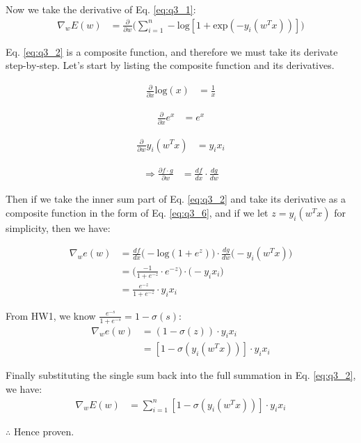Now we take the derivative of Eq. \ref{eq:q3_1}:
\begin{align}
    \nabla_w E(w) &= \frac{\partial}{\partial w} \Bigg(\sum_{i=1}^{n} -\text{log} [1+ \text{exp}(-y_i (w^T x))] \Bigg) \label{eq:q3_2}
\end{align}

Eq. \ref{eq:q3_2} is a composite function, and therefore we must take its derivate step-by-step. Let's start by listing the composite function and its derivatives.

\begin{align}
    \frac{\partial}{\partial x} \text{log}(x) &= \frac{1}{x} \label{eq:q3_3}
\end{align}

\begin{align}
    \frac{\partial}{\partial x} e^x &= e^x \label{eq:q3_4}
\end{align}

\begin{align}
    \frac{\partial}{\partial w} y_i (w^T x) &= y_i x_i \label{eq:q3_5}
\end{align}

\begin{align}
    \Rightarrow \frac{\partial f \cdot g}{\partial w} &= \frac{d f}{d x} \cdot \frac{d g}{d w} \label{eq:q3_6}
\end{align}

Then if we take the inner sum part of Eq. \ref{eq:q3_2} and take its derivative as a composite function in the form of Eq. \ref{eq:q3_6}, and if we let $z=y_i (w^T x)$ for simplicity, then we have:

\begin{align}
    \nabla_w e(w) &= \frac{d f}{d x} \Bigg(-\text{log} (1+e^z) \Bigg) \cdot  \frac{d g}{d w} \Bigg(-y_i (w^T x) \Bigg) \label{eq:q3_7} \nonumber \\
    &= \Bigg(\frac{-1}{1+e^{-z}} \cdot e^{-z} \Bigg) \cdot \Bigg(-y_i x_i \Bigg) \nonumber \\
    &= \frac{e^{-z}}{1+e^{-z}} \cdot  y_i x_i
\end{align}

From HW1, we know $\frac{e^{-s}}{1+e^{-s}}=1-\sigma(s)$:
\begin{align}
    \nabla_w e(w) &= (1-\sigma(z)) \cdot  y_i x_i \label{eq:q3_8} \nonumber \\
    &= [1-\sigma(y_i (w^T x))] \cdot  y_i x_i
\end{align}

Finally substituting the single sum back into the full summation in Eq. \ref{eq:q3_2}, we have:
\begin{align}
    \nabla_w E(w) &= \sum_{i=1}^{n} [1-\sigma(y_i (w^T x))] \cdot  y_i x_i \label{eq:q3_9} 
\end{align}

$\therefore$ Hence proven.
